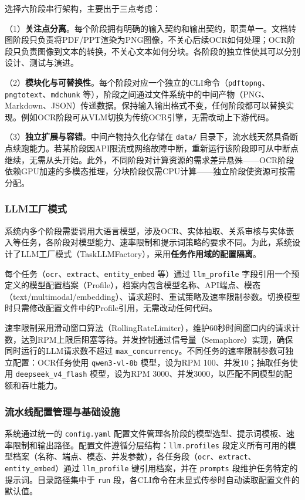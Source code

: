 选择六阶段串行架构，主要出于三点考虑：

（1）\textbf{关注点分离}。每个阶段拥有明确的输入契约和输出契约，职责单一。文档转图阶段只负责将PDF/PPT渲染为PNG图像，不关心后续OCR如何处理；OCR阶段只负责图像到文本的转换，不关心文本如何分块。各阶段的独立性使其可以分别设计、测试与演进。

（2）\textbf{模块化与可替换性}。每个阶段对应一个独立的CLI命令（\texttt{pdftopng}、\texttt{pngtotext}、\texttt{mdchunk} 等），阶段之间通过文件系统中的中间产物（PNG、Markdown、JSON）传递数据。保持输入输出格式不变，任何阶段都可以替换实现。例如OCR阶段可从VLM切换为传统OCR引擎，无需改动上下游代码。

（3）\textbf{独立扩展与容错}。中间产物持久化存储在 \texttt{data/} 目录下，流水线天然具备断点续跑能力。若某阶段因API限流或网络故障中断，重新运行该阶段即可从中断点继续，无需从头开始。此外，不同阶段对计算资源的需求差异悬殊——OCR阶段依赖GPU加速的多模态推理，分块阶段仅需CPU计算——独立阶段使资源可按需分配。

\subsubsection{LLM工厂模式}

系统内多个阶段需要调用大语言模型，涉及OCR、实体抽取、关系审核与实体嵌入等任务，各阶段对模型能力、速率限制和提示词策略的要求不同。为此，系统设计了LLM工厂模式（TaskLLMFactory），采用\textbf{任务作用域的配置隔离}。

每个任务（\texttt{ocr}、\texttt{extract}、\texttt{entity\_embed} 等）通过 \texttt{llm\_profile} 字段引用一个预定义的模型配置档案（Profile），档案内包含模型名称、API端点、模态（text/multimodal/embedding）、请求超时、重试策略及速率限制参数。切换模型时只需修改配置文件中的Profile引用，无需改动任何代码。

速率限制采用滑动窗口算法（RollingRateLimiter），维护60秒时间窗口内的请求计数，达到RPM上限后阻塞等待。并发控制通过信号量（Semaphore）实现，确保同时运行的LLM请求数不超过 \texttt{max\_concurrency}。不同任务的速率限制参数可独立配置：OCR任务使用 \texttt{qwen3-vl-8b} 模型，设为RPM 100、并发10；抽取任务使用 \texttt{deepseek\_v4\_flash} 模型，设为RPM 3000、并发3000，以匹配不同模型的配额和吞吐能力。

\subsubsection{流水线配置管理与基础设施}

系统通过统一的 \texttt{config.yaml} 配置文件管理各阶段的模型选型、提示词模板、速率限制和输出路径。配置文件遵循分层结构：\texttt{llm.profiles} 段定义所有可用的模型档案（名称、端点、模态、并发参数），各任务段（\texttt{ocr}、\texttt{extract}、\texttt{entity\_embed}）通过 \texttt{llm\_profile} 键引用档案，并在 \texttt{prompts} 段维护任务特定的提示词。目录路径集中于 \texttt{run} 段，各CLI命令在未显式传参时自动读取配置文件的默认值。

